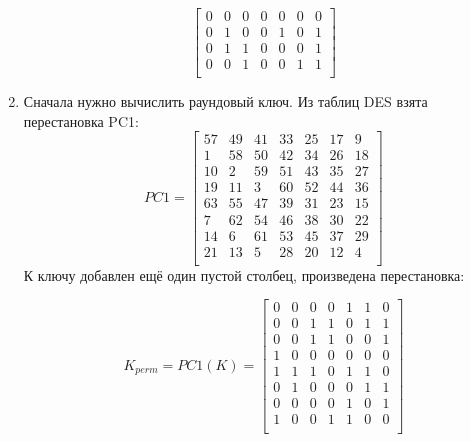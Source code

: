 \documentclass[a4paper, 14pt]{extarticle}
\begin{document}
\begin{enumerate}
\begin{equation}
\begin{bmatrix}
            0   & 0   & 0   & 0   & 0   & 0   & 0   \\
            0   & 1   & 0   & 0   & 1   & 0   & 1   \\
            0   & 1   & 1   & 0   & 0   & 0   & 1   \\
            0   & 0   & 1   & 0   & 0   & 1   & 1   \\
        \end{bmatrix}
    \end{equation}
    \item Сначала нужно вычислить раундовый ключ. Из таблиц DES взята перестановка PC1:
    \begin{equation}
        PC1 = \begin{bmatrix}
            57  & 49  & 41  & 33  & 25  & 17  & 9   \\
            1   & 58  & 50  & 42  & 34  & 26  & 18  \\
            10  & 2   & 59  & 51  & 43  & 35  & 27  \\
            19  & 11  & 3   & 60  & 52  & 44  & 36  \\
            63  & 55  & 47  & 39  & 31  & 23  & 15  \\
            7   & 62  & 54  & 46  & 38  & 30  & 22  \\
            14  & 6   & 61  & 53  & 45  & 37  & 29  \\
            21  & 13  & 5   & 28  & 20  & 12  & 4   \\
        \end{bmatrix}
    \end{equation}
    К ключу добавлен ещё один пустой столбец, произведена перестановка:

    \begin{equation}
        K_{perm} = PC1(K) = \begin{bmatrix}
            0   & 0   & 0   & 0   & 1   & 1   & 0   \\
            0   & 0   & 1   & 1   & 0   & 1   & 1   \\
            0   & 0   & 1   & 1   & 0   & 0   & 1   \\
            1   & 0   & 0   & 0   & 0   & 0   & 0   \\
            1   & 1   & 1   & 0   & 1   & 1   & 0   \\
            0   & 1   & 0   & 0   & 0   & 1   & 1   \\
            0   & 0   & 0   & 0   & 1   & 0   & 1   \\
            1   & 0   & 0   & 1   & 1   & 0   & 0   \\
        \end{bmatrix}
    \end{equation}


\end{enumerate}
\end{document}
